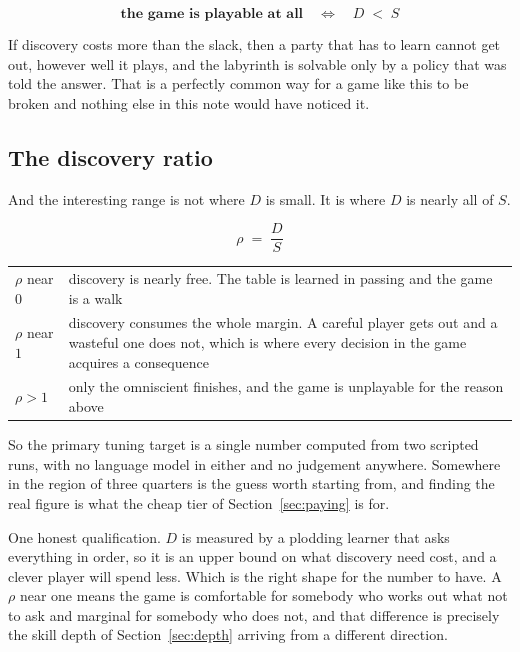 \documentclass[11pt,a4paper]{article}
\begin{document}
\begin{sectionbox}
\[ \textbf{the game is playable at all} \quad\Longleftrightarrow\quad D \;<\; S \]
\end{sectionbox}

If discovery costs more than the slack, then a party that has to learn cannot get out, however well
it plays, and the labyrinth is solvable only by a policy that was told the answer. That is a
perfectly common way for a game like this to be broken and nothing else in this note would have
noticed it.

\subsection{The discovery ratio}
\label{sec:ratio}

And the interesting range is not where $D$ is small. It is where $D$ is nearly all of $S$.

\[ \rho \;=\; \frac{D}{S} \]

\begin{center}
\begin{tabular}{@{}l@{\hspace{4mm}}>{\raggedright\arraybackslash}p{}@{}}
\toprule
$\rho$ near $0$ & discovery is nearly free. The table is learned in passing and the game is a walk
\\[1mm]
$\rho$ near $1$ & discovery consumes the whole margin. A careful player gets out and a wasteful one
does not, which is where every decision in the game acquires a consequence \\[1mm]
$\rho > 1$      & only the omniscient finishes, and the game is unplayable for the reason above
\\
\bottomrule
\end{tabular}
\end{center}

\begin{alarmbox}
So the primary tuning target is a single number computed from two scripted runs, with no language
model in either and no judgement anywhere. Somewhere in the region of three quarters is the guess
worth starting from, and finding the real figure is what the cheap tier of
Section~\ref{sec:paying} is for.
\end{alarmbox}

One honest qualification. $D$ is measured by a plodding learner that asks everything in order, so it
is an upper bound on what discovery need cost, and a clever player will spend less. Which is the
right shape for the number to have. A $\rho$ near one means the game is comfortable for somebody who
works out what not to ask and marginal for somebody who does not, and that difference is precisely
the skill depth of Section~\ref{sec:depth} arriving from a different direction.
\end{document}
